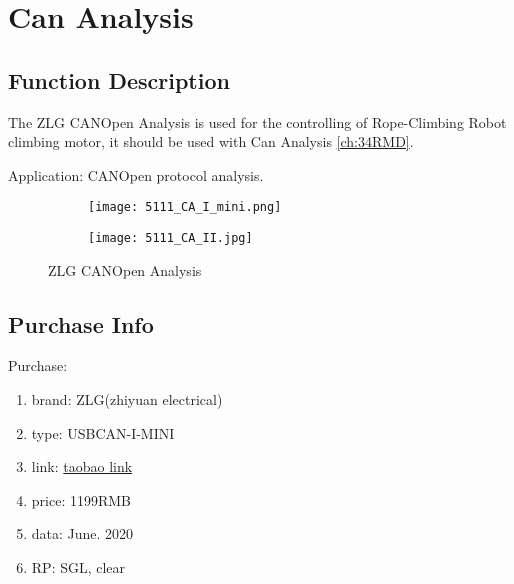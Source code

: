 \setchapterpreamble[u]{\margintoc}
\chapter{Can Analysis} 

\section{Function Description}
The ZLG CANOpen Analysis is used for the controlling of Rope-Climbing Robot climbing motor, it should be 
used with Can Analysis \ref{ch:34RMD}. 

Application: CANOpen protocol analysis.

\begin{figure}[htb]	
	\centering
	\begin{subfigure}
		\centering
		\texttt{[image: 5111\_CA\_I\_mini.png]}
	\end{subfigure}
	\quad
	\begin{subfigure}
		\centering
		\texttt{[image: 5111\_CA\_II.jpg]}
	\end{subfigure}
	\caption[ZLG CANOpen Analysis]{ 
		ZLG CANOpen Analysis	
			}\label{fig:510}
\end{figure}
	
\section{Purchase Info}
Purchase:
\begin{enumerate}
	\item brand: ZLG(zhiyuan electrical)
	\item type: USBCAN-I-MINI
	\item link: \href{https://item.taobao.com/item.htm?id=582701516953&price=1199}{taobao link} 
	\item price: 1199RMB
	\item data: June. 2020
	\item RP: SGL, clear
\end{enumerate}

